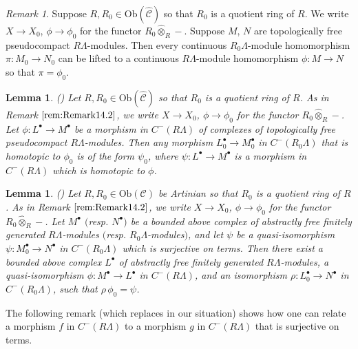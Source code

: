 \documentclass{amsart}
\theoremstyle{plain}
\newtheorem{lemma}[thm]{Lemma}
\theoremstyle{definition}
\theoremstyle{remark}
\newtheorem{rem}[thm]{Remark}
\begin{document}
\begin{rem}
\label{rem:Remark14.2}
Suppose $R,R_0\in\mathrm{Ob}(\hat{\mathcal{C}})$
so that $R_0$ is a quotient ring
of $R$.  We write $X\to X_0$, $\phi\to \phi_0$ for the functor
$R_0\hat{\otimes}_R -$.
Suppose $M$, $N$ are
topologically free pseudocompact $R\Lambda$-modules.
Then every continuous $R_0\Lambda$-module homomorphism $\pi:M_0\to N_0$
can be lifted to a continuous $R\Lambda$-module homomorphism $\phi:M\to N$
so that $\pi=\phi_0$.
\end{rem}

\begin{lemma}
\label{lem:Lemma14.3}
{\rm (\cite[Sublemma VI.8.20]{milne})}
Let $R,R_0\in\mathrm{Ob}(\hat{\mathcal{C}})$ so that
$R_0$ is a quotient ring of $R$. As in Remark $\ref{rem:Remark14.2}$,
we write $X\to X_0$, $\phi\to
\phi_0$ for the functor $R_0\hat{\otimes}_R -$.
Let $\phi:L^\bullet\to M^\bullet$ be a
morphism in $C^-(R\Lambda)$ of complexes of topologically free pseudocompact
$R\Lambda$-modules. Then any morphism $L_0^\bullet\to M_0^\bullet$ 
in $C^-(R_0\Lambda)$ that is homotopic to
$\phi_0$ is of the form $\psi_0$, where $\psi:L^\bullet\to M^\bullet$ is a morphism
in $C^-(R\Lambda)$ which is homotopic to $\phi$.
\end{lemma}

\begin{lemma}
\label{lem:Lemma14.4}
{\rm (\cite[Lemma VI.8.18]{milne})}
Let $R,R_0\in\mathrm{Ob}(\mathcal{C})$ be Artinian so that $R_0$ is a quotient ring of $R$.
As in Remark $\ref{rem:Remark14.2}$, we write $X\to X_0$, $\phi\to
\phi_0$ for the functor $R_0\hat{\otimes}_R -$. Let $M^\bullet$ $($resp. $N^\bullet${}$)$ be
a {bounded above} complex of abstractly free finitely generated  $R\Lambda$-modules $($resp.
$R_0\Lambda$-modules$)$, and let $\psi$ be
a quasi-isomorphism $\psi:M_0^\bullet {\rightarrow}N^\bullet$ in $C^-(R_0\Lambda)$
which is surjective on terms. Then there
exist a {bounded above} complex $L^\bullet$ of {abstractly free finitely generated}
$R\Lambda$-modules,
a quasi-isomorphism
$\phi:M^\bullet\to L^\bullet$ in $C^-(R\Lambda)$, and an isomorphism 
$\rho:L^\bullet_0 {\rightarrow}
N^\bullet$ in $C^-(R_0\Lambda)$, such that $\rho\, \phi_0=\psi$.
\end{lemma}

The following remark (which replaces \cite[Remark 5.2]{bcderived} in our situation)
shows how one can relate a morphism $f$ in $C^-(R\Lambda)$ to 
a morphism $g$ in $C^-(R\Lambda)$ that is surjective on terms.
\end{document}
